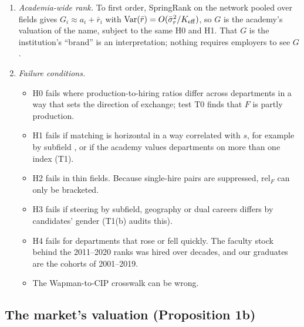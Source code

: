 \documentclass[11pt]{article}
\begin{document}
\begin{enumerate}
\citep{long1979entrance}, so status may be partly self-reinforcing. $F$ reads as a belief about the quality of a
department's PhDs only if one index drives both roles, sorting is vertical and volume does not set direction. T1 failed, so only that reading is withdrawn: $F$ is described as the ordering revealed by net placement, its
position in the hiring network. How a producer is valued depends on the categories its audience uses
\citep{zuckerman1999categorical}, which is one reason the two audiences are modelled separately.
\item \emph{Academia-wide rank.} To first order, SpringRank on the network pooled over fields gives
$G_i\approx a_i+\bar r_i$ with $\mathrm{Var}(\bar r)=O(\bar\sigma_r^2/K_{\rm eff})$, so $G$ is the academy's
valuation of the name, subject to the same H0 and H1. That $G$ is the institution's ``brand'' is an interpretation;
nothing requires employers to see $G$.
\item \emph{Failure conditions.}
\begin{itemize}
\item H0 fails where production-to-hiring ratios differ across departments in a way that sets the direction of
exchange; test T0 finds that $F$ is partly production.
\item H1 fails if matching is horizontal in a way correlated with $s$, for example by subfield
\citep{laberge2022subfield}, or if the academy values departments on more than one index (T1).
\item H2 fails in thin fields. Because single-hire pairs are suppressed, $\mathrm{rel}_F$ can only be bracketed.
\item H3 fails if steering by subfield, geography or dual careers differs by candidates' gender (T1(b) audits
this).
\item H4 fails for departments that rose or fell quickly. The faculty stock behind the 2011--2020 ranks was hired
over decades, and our graduates are the cohorts of 2001--2019.
\item The Wapman-to-CIP crosswalk can be wrong.
\end{itemize}
\end{enumerate}

\subsection{The market's valuation (Proposition 1b)}\label{si:theory:market}
\end{document}
